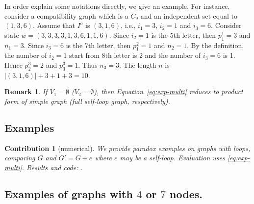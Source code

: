 \documentclass[11pt]{article}
\newtheorem{remark}[theorem]{Remark}
\newtheorem{contribution}{Contribution}
\begin{document}
In order explain some notations directly, we give an example. For instance, consider a compatibility graph which is a $C_9$ and an independent set equal  to $(1,3,6)$.
Assume that $I^o$ is $(3,1,6)$, i.e., $i_1=3$, $i_2=1$ and $i_3=6$. Consider state $w=(3,3,3,3,1,3,6,1,1,6)$.
Since $i_2=1$ is the 5th letter, then $p_1^1=3$ and $n_1=3$. 
Since $i_3=6$ is the 7th letter, then $p_1^2 =1$ and $n_2=1$. 
By the definition, the number of $i_2=1$ start from 8th letter is 2 and the number of $i_3=6$ is 1. Hence $p_2^3=2$ and $p_3^3=1$. Thus $n_3=3$. The length $n$ is $|(3,1,6)|+3+1+3=10$.

\begin{remark}
If $V_1=\emptyset$ ($V_2=\emptyset$), then Equation~\eqref{eq:exp-multi} reduces to product form of simple graph (full self-loop graph, respectively).
\end{remark}

\subsection{Examples}
\begin{contribution}[numerical]
We provide paradox examples on graphs with loops, comparing $G$ and $G'=G+e$ where $e$ may be a self-loop. 
Evaluation uses \eqref{eq:exp-multi}. 
Results and code: \cite{li2025b}.
\end{contribution}

\subsection{Examples of  graphs with $4$ or $7$ nodes.}\label{subsec:example}
\end{document}
